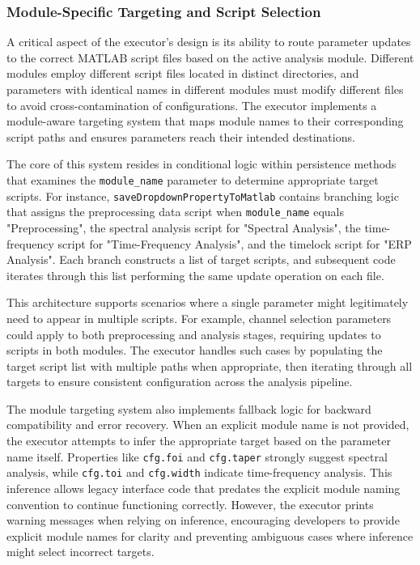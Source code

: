 \documentclass[12pt]{report}
\begin{document}
\subsubsection{Module-Specific Targeting and Script Selection}

A critical aspect of the executor's design is its ability to route parameter updates to the correct MATLAB script files based on the active analysis module. Different modules employ different script files located in distinct directories, and parameters with identical names in different modules must modify different files to avoid cross-contamination of configurations. The executor implements a module-aware targeting system that maps module names to their corresponding script paths and ensures parameters reach their intended destinations.

The core of this system resides in conditional logic within persistence methods that examines the \verb|module_name| parameter to determine appropriate target scripts. For instance, \verb|saveDropdownPropertyToMatlab| contains branching logic that assigns the preprocessing data script when \verb|module_name| equals "Preprocessing", the spectral analysis script for "Spectral Analysis", the time-frequency script for "Time-Frequency Analysis", and the timelock script for "ERP Analysis". Each branch constructs a list of target scripts, and subsequent code iterates through this list performing the same update operation on each file.

This architecture supports scenarios where a single parameter might legitimately need to appear in multiple scripts. For example, channel selection parameters could apply to both preprocessing and analysis stages, requiring updates to scripts in both modules. The executor handles such cases by populating the target script list with multiple paths when appropriate, then iterating through all targets to ensure consistent configuration across the analysis pipeline.

The module targeting system also implements fallback logic for backward compatibility and error recovery. When an explicit module name is not provided, the executor attempts to infer the appropriate target based on the parameter name itself. Properties like \verb|cfg.foi| and \verb|cfg.taper| strongly suggest spectral analysis, while \verb|cfg.toi| and \verb|cfg.width| indicate time-frequency analysis. This inference allows legacy interface code that predates the explicit module naming convention to continue functioning correctly. However, the executor prints warning messages when relying on inference, encouraging developers to provide explicit module names for clarity and preventing ambiguous cases where inference might select incorrect targets.
\end{document}
